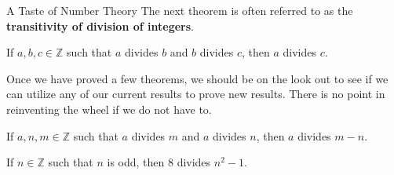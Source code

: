 \begin{section}{A Taste of Number Theory}
The next theorem is often referred to as the \textbf{transitivity of division of integers}.

\begin{theorem}\label{thm:transitivity of divides}
If $a,b,c\in\mathbb{Z}$ such that $a$ divides $b$ and $b$ divides $c$, then $a$ divides $c$.
\end{theorem}

Once we have proved a few theorems, we should be on the look out to see if we can utilize any of our current results to prove new results.  There is no point in reinventing the wheel if we do not have to.

\begin{theorem}
If $a,n,m\in\mathbb{Z}$ such that $a$ divides $m$ and $a$ divides $n$, then $a$ divides $m-n$.
\end{theorem}

\begin{theorem}
If $n\in\mathbb{Z}$ such that $n$ is odd, then 8 divides $n^{2}-1$.
\end{theorem}

\end{section}